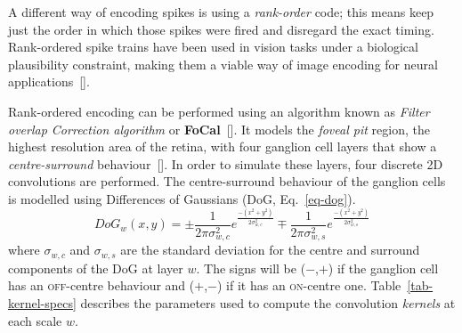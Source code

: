 A different way of encoding spikes is using a \emph{rank-order} code; this means
keep just the order in which those spikes were fired and disregard the exact timing. Rank-ordered spike trains have been used in vision tasks under a biological plausibility constraint, making them a viable way of image encoding for neural applications~[\cite{van-rullen-rate-coding,basab-model,Masmoudi2010}].

Rank-ordered encoding can be performed using an algorithm known as 
\emph{Filter overlap Correction algorithm} or \textbf{FoCal}~[\cite{basab-model}]. It models the \emph{foveal pit} region, the highest resolution area of the retina, with four ganglion cell layers that show a \emph{centre-surround} behaviour~[\cite{Kolb2003}]. In order to simulate these layers, four discrete 2D convolutions are performed. The centre-surround behaviour of the ganglion cells is modelled using Differences of Gaussians (DoG, Eq.~\ref{eq-dog}). 
\begin{equation}
\label{eq-dog}
DoG_w(x,y) = \pm\frac{1}{2\pi\sigma_{w,c}^2}e^{\frac{-(x^2 + y^2)}{2\sigma_{w,c}^2}}
\mp\frac{1}{2\pi\sigma_{w,s}^2}e^{\frac{-(x^2 + y^2)}{2\sigma_{w,s}^2}}
\end{equation}
where $\sigma_{w,c}$ and $\sigma_{w,s}$ are the standard deviation for the 
centre and surround components of the DoG at layer $w$. The signs 
will be ($-$,$+$) if the ganglion cell has an \textsc{off}-centre behaviour and 
($+$,$-$) if it has an \textsc{on}-centre one. Table~\ref{tab-kernel-specs} 
describes the parameters used to compute the convolution \emph{kernels} at each 
scale $w$.

